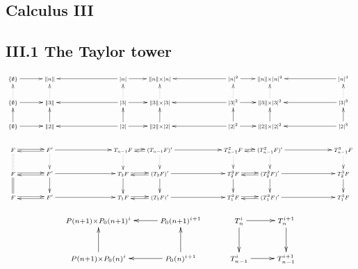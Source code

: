 \documentclass[11pt]{article}
\begin{document}
\begin{Calculus III}
\section*{Calculus III}
\subsection*{III.1 The Taylor tower}

\[{
\def\objectstyle{\scriptstyle}
\xymatrix@R=1.1cm@C=17mm@!0{
\{\emptyset\}
\ar[r]
&%
{\|n\|}
&&%
\ar[ll]
{|n|}
\ar[r]
&%
{\|n\|\times|n|}
&&%
\ar[ll]
{|n|^2}\ar[r]
&%
{\|n\|\times|n|^2}
&&%
\ar[ll]
{|n|^3}
\\
\{\emptyset\}
\ar@{..>}[u]
\ar[r]
&%
{\|3\|}
\ar@{..>}[u]
&&%
\ar[ll]
{|3|}
\ar@{..>}[u]
\ar[r]
&%
{\|3\|\times|3|}
\ar@{..>}[u]
&&%
\ar[ll]
{|3|^2}\ar[r]
\ar@{..>}[u]
&%
{\|3\|\times|3|^2}
\ar@{..>}[u]
&&%
\ar[ll]
{|3|^3}
\ar@{..>}[u]
\\
\{\emptyset\}
\ar[u]
\ar[r]
&%
{\|2\|}
\ar[u]
&&%
\ar[ll]
{|2|}
\ar[u]
\ar[r]
&%
{\|2\|\times|2|}
\ar[u]
&&%
\ar[ll]
{|2|^2}\ar[r]
\ar[u]
&%
{\|2\|\times|2|^2}
\ar[u]
&&%
\ar[ll]
{|2|^3}
\ar[u]
\\
F
\ar@{::}[d]
\ar@<.2ex>[r]
&
F'
\ar@{..>}[d]
\ar@<.4ex>[l]
\ar[rr]
&&
T_{n-1}F
\ar@<.2ex>[r]
\ar@{..>}[d]
&
(T_{n-1}F)'
\ar@<.4ex>[l]
\ar[rr]
\ar@{..>}[d]
&&
T_{n-1}^2F
\ar@<.2ex>[r]
\ar@{..>}[d]
&
(T_{n-1}^2F)'
\ar@<.4ex>[l]
\ar[rr]
\ar@{..>}[d]
&&
T_{n-1}^3F
\ar@{..>}[d]
\\
F
\ar@{=}[d]
\ar@<.2ex>[r]
&
F'
\ar[d]
\ar@<.4ex>[l]
\ar[rr]
&&
T_2F
\ar@<.2ex>[r]
\ar[d]
&
(T_2F)'
\ar@<.4ex>[l]
\ar[rr]
\ar[d]
&&
T_2^2F
\ar@<.2ex>[r]
\ar[d]
&
(T_2^2F)'
\ar@<.4ex>[l]
\ar[rr]
\ar[d]
&&
T_2^3F
\ar[d]
\\
F
\ar@<.2ex>[r]
&
F'
\ar@<.4ex>[l]
\ar[rr]
&&
T_1F
\ar@<.2ex>[r]
&
(T_1F)'
\ar@<.4ex>[l]
\ar[rr]
&&
T_1^2F
\ar@<.2ex>[r]
&
(T_1^2F)'
\ar@<.4ex>[l]
\ar[rr]
&&
T_1^3F
}}\]

\[\xymatrix{
P(n+1)\times P_0(n+1)^i
&%
P_0(n+1)^{i+1}
\ar[l]
&%
T_n^i
\ar[r]
\ar[d]_{}="1"
&%
T_n^{i+1}
\ar[d]
\\%
P(n+1)\times P_0(n)^i
\ar[u]
&%
P_0(n)^{i+1}
\ar[l]
\ar[u]_{}="2"
&%
T^i_{n-1}
\ar[r]
&%
T^{i+1}_{n-1}
}\]

\end{Calculus III}
\end{document}
